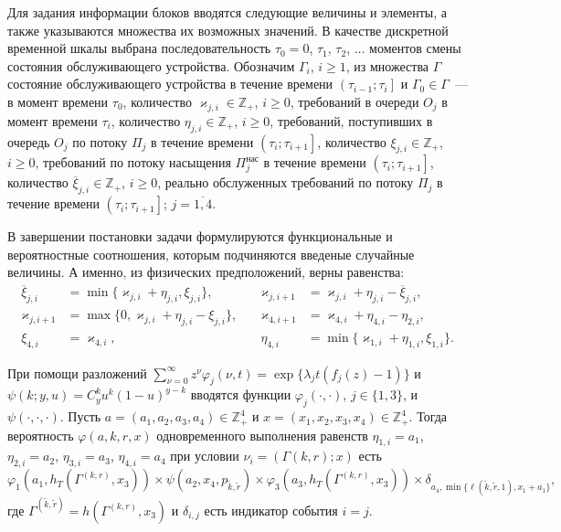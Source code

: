 \documentclass[14pt]{extarticle}
\theoremstyle{theorem}
\theoremstyle{remark}
\begin{document}
Для задания информации блоков вводятся следующие величины и элементы, а также указываются множества их возможных значений. В качестве дискретной временной шкалы выбрана последовательность $\tau_0=0$, $\tau_1$, $\tau_2$, $\ldots$ моментов смены состояния обслуживающего устройства. Обозначим $\Gamma_i$, $i\geqslant 1$, из множества $\Gamma$ состояние обслуживающего устройства в течение времени $\left(\tau_{i-1};\tau_i\right]$ и $\Gamma_0\in \Gamma$~--- в момент времени $\tau_0$, количество $\varkappa_{j,i} \in \mathbb{Z}_+ $, $i\geqslant 0$, требований в очереди $O_j$ в момент времени $\tau_i$, количество $\eta_{j,i} \in \mathbb{Z}_+$, $i\geqslant 0$, требований, поступивших в очередь $O_j$ по потоку $\Pi_j$ в течение времени $\left(\tau_{i};\tau_{i+1}\right]$, количество $\xi_{j,i} \in \mathbb{Z}_+$, $i\geqslant 0$, требований по потоку насыщения $\Pi^{\mathrm{\text{нас}}}_j$ в течение времени $\left(\tau_{i};\tau_{i+1}\right]$, количество $\overline{\xi}_{j,i}\in \mathbb{Z}_+$, $i\geqslant 0$, реально обслуженных требований по потоку $\Pi_j$ в течение времени $\left(\tau_{i};\tau_{i+1}\right]$; $j=\overline{1,4}$.

В завершении постановки задачи формулируются функциональные и вероятностные соотношения, которым подчиняются введеные случайные величины. А именно, из физических предположений, верны равенства:
\begin{equation}
\begin{aligned}
\overline{\xi}_{j,i}&=\min\{\varkappa_{j,i}+\eta_{j,i},\xi_{j,i}\}, \quad & \varkappa_{j,i+1}&=\varkappa_{j,i}+\eta_{j,i}-\overline{\xi}_{j,i},  \\
\varkappa_{j,i+1}&=\max\{{0,\varkappa_{j,i}+\eta_{j,i}-\xi_{j,i}}\}, \quad & \varkappa_{4,i+1}&=\varkappa_{4,i}+\eta_{4,i}-\eta_{2,i}, \\
\xi_{4,i} & = \varkappa_{4,i}, & \eta_{4,i} & = \min\{ \varkappa_{1,i} + \eta_{1,i}, \xi_{1,i}\}.
\end{aligned}
\label{rekk}
\end{equation}


При помощи разложений $\sum_{\nu=0}^{\infty} z^\nu\varphi_j(\nu,t) = \exp\{\lambda_j t (f_j(z)-1)\}$ и $\psi(k;y,u)=C_y^k u^k (1-u)^{y-k}$ вводятся функции $\varphi_j(\cdot,\cdot)$, $j\in \{1,3\}$, и $\psi(\cdot, \cdot, \cdot)$. Пусть $a=(a_1, a_2, a_3, a_4) \in \mathbb{Z}_+^4$ и $x=(x_1, x_2, x_3, x_4) \in \mathbb{Z}_+^4$.
Тогда вероятность $\varphi(a,k,r,x)$ одновременного выполнения равенств $\eta_{1,i}=a_1$, $\eta_{2,i}=a_2$, $\eta_{3,i}=a_3$, $\eta_{4,i}=a_4$ при условии  $\nu_i=(\Gamma{(k,r)}; x)$ есть 
\begin{equation}
\!\!\varphi_1(a_1,h_T(\Gamma^{({k},{r})},x_3)) \times \psi(a_2,x_4, p_{\tilde{k},\tilde{r}}) \times \varphi_3(a_3,h_T(\Gamma^{({k},{r})},x_3))
\times \delta_{a_4,\min{\{\ell(\tilde{k},\tilde{r},1), x_1+a_1}\}},
\label{rekk:1}
\end{equation}
где $\Gamma^{(\tilde{k},\tilde{r})}=h(\Gamma^{(k,r)},x_3)$ и $\delta_{i,j}$ есть индикатор события $i=j$.
\end{document}
